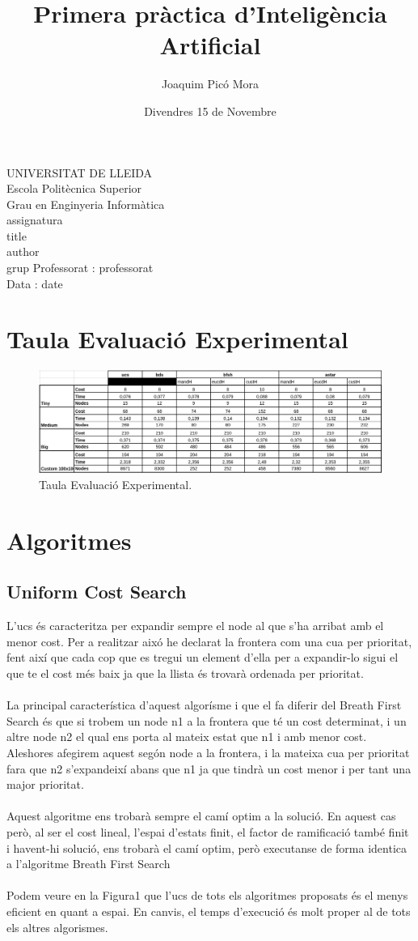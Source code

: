 \documentclass{article}
\title{Primera pràctica d'Inteligència Artificial}
\author{Joaquim Picó Mora}
\date{Divendres 15 de Novembre}
\renewcommand{\maketitle}{ %
    \begin{titlepage}
        \raggedright{UNIVERSITAT DE LLEIDA \\
            Escola Politècnica Superior \\
            Grau en Enginyeria Informàtica\\
            \1assignatura\\}
            \vspace{5cm}
            \centering\huge{\5title \\}
            \vspace{3cm}
            \large{\6author} \\
            \normalsize{\3grup}
            \vfill
            Professorat : \4professorat \\
            Data : \7date
\end{titlepage}}
\begin{document}
\maketitle
\thispagestyle{empty}

\newpage
{}
\tableofcontents
\newpage
{}

\section{Taula Evaluació Experimental}
\begin{figure}[h!]
	\centering
	\includegraphics[width=0.7\textheight]{taula.png}
	\caption{Taula Evaluació Experimental.}
	\label{tee}
\end{figure}
\section{Algoritmes}
%
\subsection{Uniform Cost Search}
L'ucs és caracteritza per expandir sempre el node al que s'ha arribat amb el menor cost. Per a realitzar aixó he declarat la frontera com una cua per prioritat, fent així que cada cop que es tregui un element d'ella per a expandir-lo sigui el que te el cost més baix ja que la llista és trovarà ordenada per prioritat. 
\\\\
La principal característica d'aquest algorísme i que el fa diferir del Breath First Search és que si trobem un node n1 a la frontera que té un cost determinat, i un altre node n2 el qual ens porta al mateix estat que n1 i amb menor cost. Aleshores afegirem aquest segón node  a la frontera, i la mateixa cua per prioritat fara que n2 s'expandeixí abans que n1 ja que tindrà un cost menor i per tant una major prioritat.
\\\\
Aquest algoritme ens trobarà sempre el camí optim a la solució. En aquest cas però, al ser el cost lineal, l'espai d'estats finit, el factor de ramificació també finit i havent-hi solució, ens trobarà el camí optim, però executanse de forma identica a l'algoritme Breath First Search
\\\\
Podem veure en la Figura1 que l'ucs de tots els algoritmes proposats és el menys eficient en quant a espai. En canvis, el temps d'execució és molt proper al de tots els altres algorismes.
\end{document}
